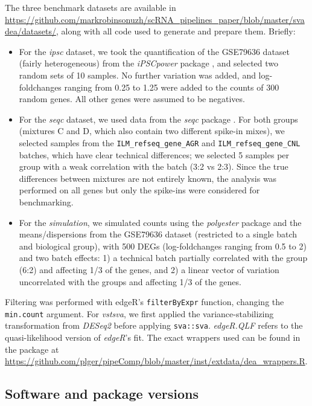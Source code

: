 \documentclass{bmcart}
\begin{document}
The three benchmark datasets are available in \url{https://github.com/markrobinsonuzh/scRNA\_pipelines\_paper/blob/master/svadea/datasets/}, along with all code used to generate and prepare them. Briefly:
\begin{itemize}
    \item For the \textit{ipsc} dataset, we took the quantification of the GSE79636 dataset (fairly heterogeneous) from the \textit{iPSCpower} package \citep{germainTamingHumanGenetic2017}, and selected two random sets of 10 samples. No further variation was added, and log-foldchanges ranging from 0.25 to 1.25 were added to the counts of 300 random genes. All other genes were assumed to be negatives.
    \item For the \textit{seqc} dataset, we used data from the \textit{seqc} package \citep{ComprehensiveAssessment2014}. For both groups (mixtures C and D, which also contain two different spike-in mixes), we selected samples from the \texttt{ILM\_refseq\_gene\_AGR} and \texttt{ILM\_refseq\_gene\_CNL} batches, which have clear technical differences; we selected 5 samples per group with a weak correlation with the batch (3:2 vs 2:3). Since the true differences between mixtures are not entirely known, the analysis was performed on all genes but only the spike-ins were considered for benchmarking.
    \item For the \textit{simulation}, we simulated counts using the \textit{polyester} package \citep{frazeePolyesterSimulating2015} and the means/dispersions from the GSE79636 dataset (restricted to a single batch and biological group), with 500 DEGs (log-foldchanges ranging from 0.5 to 2) and two batch effects: 1) a technical batch partially correlated with the group (6:2) and affecting 1/3 of the genes, and 2) a linear vector of variation uncorrelated with the groups and affecting 1/3 of the genes.
\end{itemize}

Filtering was performed with edgeR's \texttt{filterByExpr} function, changing the \texttt{min.count} argument. For \textit{vstsva}, we first applied the variance-stabilizing transformation from \textit{DESeq2} \citep{loveModeratedEstimation2014} before applying \texttt{sva::sva}. \textit{edgeR.QLF} refers to the quasi-likelihood version \citep{lundDetectingDifferential2012} of \textit{edgeR}'s fit. The exact wrappers used can be found in the package at \url{https://github.com/plger/pipeComp/blob/master/inst/extdata/dea\_wrappers.R}.


\subsection*{Software and package versions}
\end{document}
